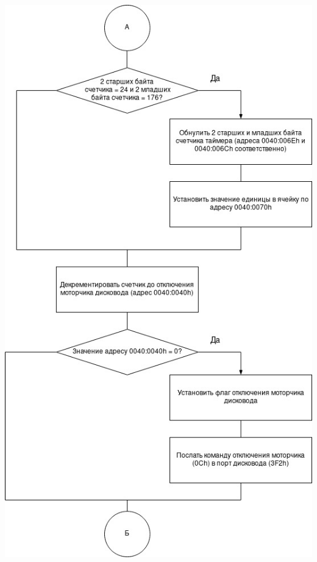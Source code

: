 \documentclass[a4paper,12pt]{article}
\begin{document}
\begin{flushright}
	\includegraphics[scale=0.735]{../src/int8h_2.jpg}

\end{flushright}
\end{document}
